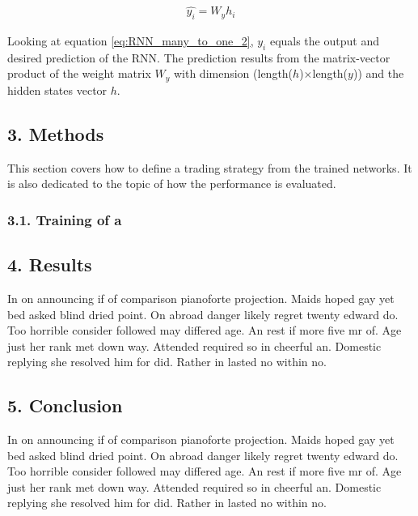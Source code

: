 \documentclass[
]{article}
\begin{document}
\begin{align} \label{eq:RNN_many_to_one_2}
  \hat{y_{i}} = W_{y}h_{i}
\end{align}

Looking at equation \ref{eq:RNN_many_to_one_2}, \(y_{i}\) equals the
output and desired prediction of the RNN. The prediction results from
the matrix-vector product of the weight matrix \(W_{y}\) with dimension
(length(\(h\))\(\times\)length(\(y\))) and the hidden states vector
\(h\).

\newpage

\hypertarget{methods}{%
\subsection{3. Methods}\label{methods}}

This section covers how to define a trading strategy from the trained
networks. It is also dedicated to the topic of how the performance is
evaluated.

\hypertarget{training-of-a}{%
\subsubsection{3.1. Training of a}\label{training-of-a}}

\newpage

\hypertarget{results}{%
\subsection{4. Results}\label{results}}

In on announcing if of comparison pianoforte projection. Maids hoped gay
yet bed asked blind dried point. On abroad danger likely regret twenty
edward do. Too horrible consider followed may differed age. An rest if
more five mr of. Age just her rank met down way. Attended required so in
cheerful an. Domestic replying she resolved him for did. Rather in
lasted no within no.

\newpage

\hypertarget{conclusion}{%
\subsection{5. Conclusion}\label{conclusion}}

In on announcing if of comparison pianoforte projection. Maids hoped gay
yet bed asked blind dried point. On abroad danger likely regret twenty
edward do. Too horrible consider followed may differed age. An rest if
more five mr of. Age just her rank met down way. Attended required so in
cheerful an. Domestic replying she resolved him for did. Rather in
lasted no within no.
\end{document}
